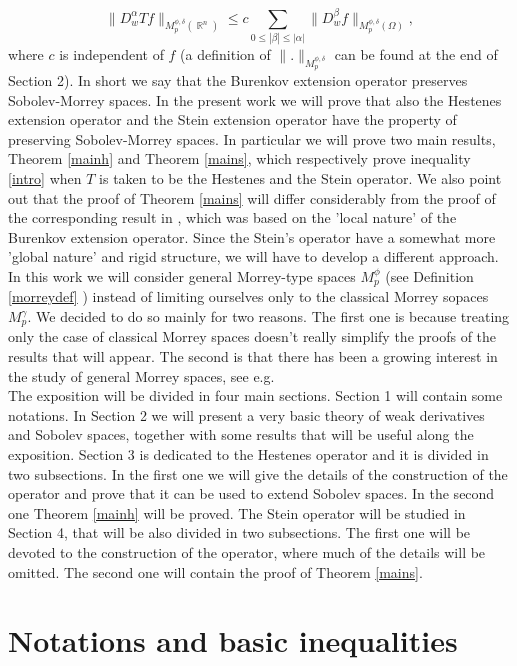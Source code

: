 \documentclass[12pt]{article}
\theoremstyle{definition}
\DeclareMathOperator\rr{\mathbb{R}}
\begin{document}
\begin{equation}
\| D^\alpha_w Tf\|_{M_p^{\phi,\delta}(\rr^n)} \le   c\sum_{0\le |\beta|\le|\alpha| }\| D^\beta_wf\|_{M_p^{\phi,\delta}(\Omega)}, \label{intro}
\end{equation}
where $c$ is independent of $f$ (a definition of $\|.\|_{M_p^{\phi,\delta}}$ can be found at the end of Section 2). In short we say that the Burenkov extension operator preserves Sobolev-Morrey spaces. In the present work we will prove that also the Hestenes extension operator  and the Stein extension operator have the property of preserving Sobolev-Morrey spaces. In particular we will prove two main results, Theorem \ref{mainh} and Theorem \ref{mains}, which respectively  prove inequality \eqref{intro} when $T$ is taken to be the Hestenes and the Stein operator. We also point out that the proof of Theorem \ref{mains} will differ considerably from the proof of the corresponding result in \cite{lamberti}, which was based on the 'local nature' of the Burenkov extension operator. Since the Stein's operator have a somewhat more 'global nature' and rigid structure, we will have to develop a different approach.\\
In this work we will consider general Morrey-type spaces $M_p^{\phi}$ (see Definition \ref{morreydef} ) instead of limiting ourselves only to the classical Morrey sopaces $M_p^\gamma.$ We decided to do so mainly for two reasons. The first one is because treating only the case of classical Morrey spaces doesn't really simplify the proofs of the results that will appear. The second  is that there has been a growing interest in the study of general Morrey spaces, see e.g. \cite{burenkov3} \\
The exposition will be divided in four main sections. Section 1  will contain some notations. In Section 2 we will present a very basic theory of weak derivatives and Sobolev spaces, together with some results that will be useful along the exposition.  Section 3 is dedicated to the Hestenes operator and it is divided in two subsections. In the first one we will give the details of the construction of the operator and prove that it can be used to extend Sobolev spaces. In the second one Theorem \ref{mainh} will be proved. The Stein operator will be studied in Section 4, that will be also divided in two subsections. The first one will be devoted to the construction of the operator, where much of the details will be omitted. The second  one will contain the proof of Theorem \ref{mains}.

\section{Notations and basic inequalities}
\end{document}

